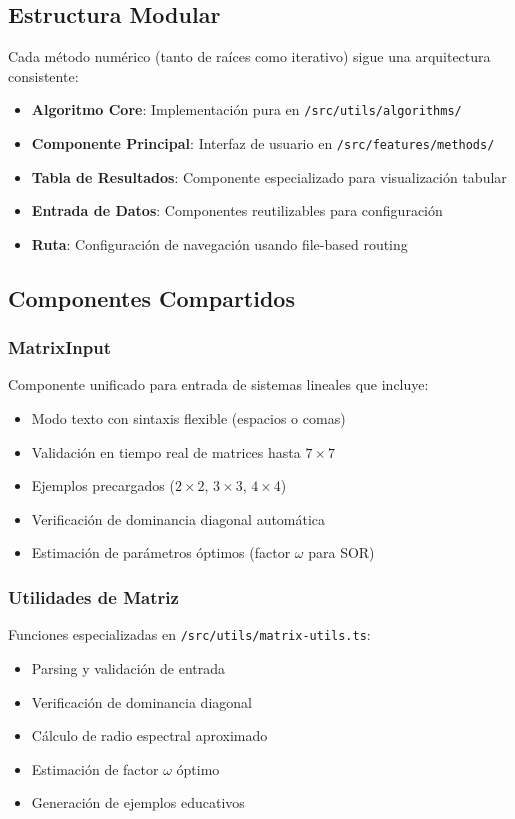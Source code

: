\subsection{Estructura Modular}

Cada método numérico (tanto de raíces como iterativo) sigue una arquitectura consistente:

\begin{itemize}
    \item \textbf{Algoritmo Core}: Implementación pura en \texttt{/src/utils/algorithms/}
    \item \textbf{Componente Principal}: Interfaz de usuario en \texttt{/src/features/methods/}
    \item \textbf{Tabla de Resultados}: Componente especializado para visualización tabular
    \item \textbf{Entrada de Datos}: Componentes reutilizables para configuración
    \item \textbf{Ruta}: Configuración de navegación usando file-based routing
\end{itemize}

\subsection{Componentes Compartidos}

\subsubsection{MatrixInput}
Componente unificado para entrada de sistemas lineales que incluye:
\begin{itemize}
    \item Modo texto con sintaxis flexible (espacios o comas)
    \item Validación en tiempo real de matrices hasta $7 \times 7$
    \item Ejemplos precargados ($2 \times 2$, $3 \times 3$, $4 \times 4$)
    \item Verificación de dominancia diagonal automática
    \item Estimación de parámetros óptimos (factor $\omega$ para SOR)
\end{itemize}

\subsubsection{Utilidades de Matriz}
Funciones especializadas en \texttt{/src/utils/matrix-utils.ts}:
\begin{itemize}
    \item Parsing y validación de entrada
    \item Verificación de dominancia diagonal
    \item Cálculo de radio espectral aproximado
    \item Estimación de factor $\omega$ óptimo
    \item Generación de ejemplos educativos
\end{itemize}

